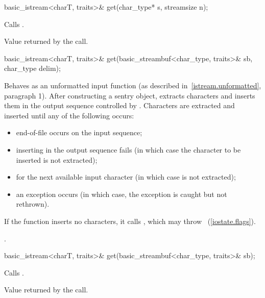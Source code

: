 %
\begin{itemdecl}
basic_istream<charT, traits>& get(char_type* s, streamsize n);
\end{itemdecl}

\begin{itemdescr}
\pnum
\effects
Calls
.

\pnum
\returns
Value returned by the call.
\end{itemdescr}

%
\begin{itemdecl}
basic_istream<charT, traits>& get(basic_streambuf<char_type, traits>& sb,
                                  char_type delim);
\end{itemdecl}

\begin{itemdescr}
\pnum
\effects
Behaves as an unformatted input function
(as described in~\ref{istream.unformatted}, paragraph 1).
After constructing a sentry object, extracts
characters and inserts them
in the output sequence controlled by
.
Characters are extracted and inserted until any of the following occurs:
\begin{itemize}
\item
end-of-file occurs on the input sequence;
\item
inserting in the output sequence fails
(in which case the character to be inserted is not extracted);
\item
{} for the next available input
character 
(in which case  is not extracted);
\item
an exception occurs
(in which case, the exception is caught but not rethrown).
\end{itemize}

\pnum
If the function inserts no characters, it calls
,
which may throw
~(\ref{iostate.flags}).

\pnum
\returns
{}.
\end{itemdescr}

%
\begin{itemdecl}
basic_istream<charT, traits>& get(basic_streambuf<char_type, traits>& sb);
\end{itemdecl}

\begin{itemdescr}
\pnum
\effects
Calls
.

\pnum
\returns
Value returned by the call.
\end{itemdescr}


